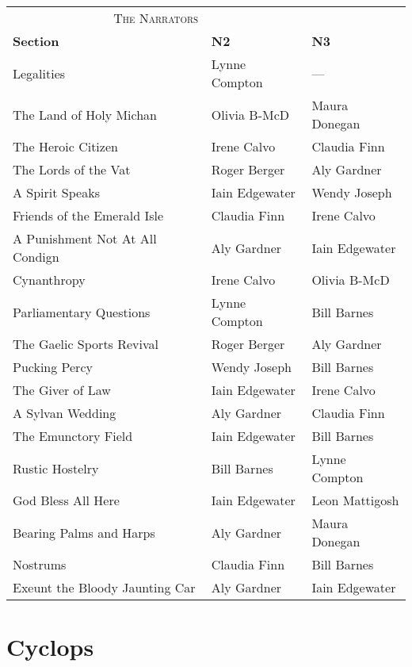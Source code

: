 \begin{tabular}{lll}
    \multicolumn{2}{c}{\Large \textsc{The Narrators}} \\
\textbf{Section}                    & \textbf{N2}       & \textbf{N3} \\
Legalities                          & Lynne Compton     & --- \\
The Land of Holy Michan             & Olivia B-McD      & Maura Donegan \\
The Heroic Citizen                  & Irene Calvo       & Claudia Finn \\
The Lords of the Vat                & Roger Berger      & Aly Gardner \\
A Spirit Speaks                     & Iain Edgewater    & Wendy Joseph \\
Friends of the Emerald Isle         & Claudia Finn      & Irene Calvo \\
A Punishment Not At All Condign     & Aly Gardner       & Iain Edgewater \\
Cynanthropy                         & Irene Calvo       & Olivia B-McD \\
Parliamentary Questions             & Lynne Compton     & Bill Barnes \\
The Gaelic Sports Revival           & Roger Berger      & Aly Gardner \\
Pucking Percy                       & Wendy Joseph      & Bill Barnes \\
The Giver of Law                    & Iain Edgewater    & Irene Calvo \\
A Sylvan Wedding                    & Aly Gardner       & Claudia Finn \\
The Emunctory Field                 & Iain Edgewater    & Bill Barnes \\
Rustic Hostelry                     & Bill Barnes       & Lynne Compton \\
God Bless All Here                  & Iain Edgewater    & Leon Mattigosh \\
Bearing Palms and Harps             & Aly Gardner       & Maura Donegan \\
Nostrums                            & Claudia Finn      & Bill Barnes \\
Exeunt the Bloody Jaunting Car      & Aly Gardner       & Iain Edgewater \\
\end{tabular}

\thispagestyle{empty}
\newpage


\setcounter{page}{1}

\section*{Cyclops}




